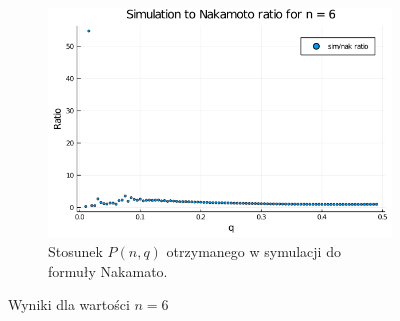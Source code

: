 \documentclass{article}
\begin{document}
\begin{figure}[H]
            \begin{subfigure}{0.65\textwidth}
                \includegraphics[width=\linewidth]{img/mc_to_na_n=6.png}
                \caption{Stosunek $P(n,q)$ otrzymanego w symulacji do formuły Nakamato.}
            \end{subfigure}
    
            \caption{Wyniki dla wartości $n = 6$}
        \end{figure}
\end{document}
